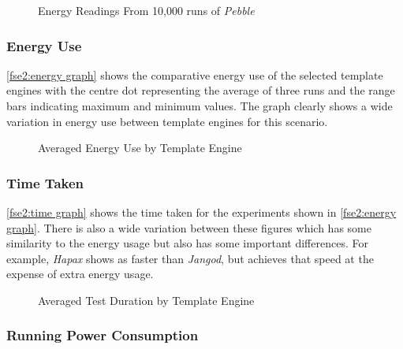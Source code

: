 \begin{figure}[htbp]
  \centering
  
  \caption{Energy Readings From 10,000 runs of \emph{Pebble}}
  \label{fse2:energy single 10000}
\end{figure}

\subsubsection{Energy Use}
\label{fse2 results energy}

\autoref{fse2:energy graph} shows the comparative energy use of the selected template engines with the centre dot representing the average of three runs and the range bars indicating maximum and minimum values. The graph clearly shows a wide variation in energy use between template engines for this scenario.

\begin{figure}[htbp]
  \centering
  
  \caption{Averaged Energy Use by Template Engine}
  \label{fse2:energy graph}
\end{figure}

\subsubsection{Time Taken}
\label{fse2 results time}

\autoref{fse2:time graph} shows the time taken for the experiments shown in \autoref{fse2:energy graph}. There is also a wide variation between these figures which has some similarity to the energy usage but also has some important differences. For example, \emph{Hapax} shows as faster than \emph{Jangod}, but achieves that speed at the expense of extra energy usage.

\begin{figure}[htbp]
  \centering
  
  \caption{Averaged Test Duration by Template Engine}
  \label{fse2:time graph}
\end{figure}

\subsubsection{Running Power Consumption}
\label{fse2 results power}

